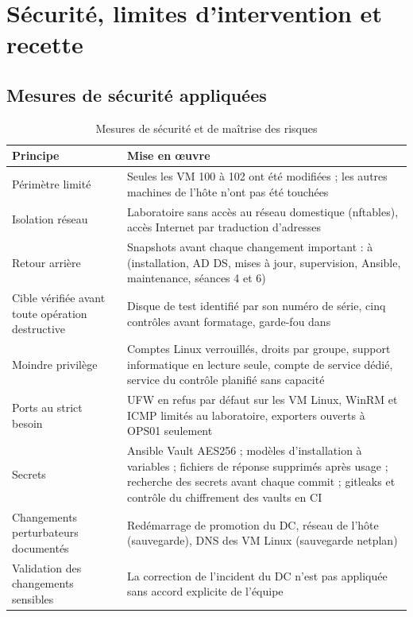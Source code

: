 \chapter{Sécurité, limites d'intervention et recette}\label{chap:securite}

\section{Mesures de sécurité appliquées}

\begin{table}[H]
\centering
\caption{Mesures de sécurité et de maîtrise des risques}\label{tab:securite}
\begin{tabularx}{\linewidth}{@{}P{3.8cm}L@{}}
\toprule
\textbf{Principe} & \textbf{Mise en œuvre} \\
\midrule
Périmètre limité & Seules les VM 100 à 102 ont été modifiées ; les autres machines de l'hôte n'ont pas été touchées \\
Isolation réseau & Laboratoire sans accès au réseau domestique (nftables), accès Internet par traduction d'adresses \\
Retour arrière & Snapshots avant chaque changement important :  à  (installation, AD DS, mises à jour, supervision, Ansible, maintenance, séances 4 et 6) \\
Cible vérifiée avant toute opération destructive & Disque de test identifié par son numéro de série, cinq contrôles avant formatage, garde-fou dans  \\
Moindre privilège & Comptes Linux verrouillés, droits par groupe, support informatique en lecture seule, compte de service  dédié, service du contrôle planifié sans capacité \\
Ports au strict besoin & UFW en refus par défaut sur les VM Linux, WinRM et ICMP limités au laboratoire, exporters ouverts à OPS01 seulement \\
Secrets & Ansible Vault AES256 ; modèles d'installation à variables ; fichiers de réponse supprimés après usage ; recherche des secrets avant chaque commit ; gitleaks et contrôle du chiffrement des vaults en CI \\
Changements perturbateurs documentés & Redémarrage de promotion du DC, réseau de l'hôte (sauvegarde), DNS des VM Linux (sauvegarde netplan) \\
Validation des changements sensibles & La correction de l'incident du DC n'est pas appliquée sans accord explicite de l'équipe \\
\bottomrule
\end{tabularx}
\end{table}

